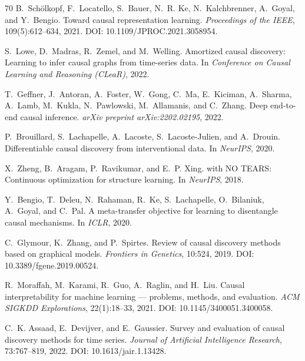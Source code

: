 \documentclass[11pt]{article}
\begin{document}
\begin{thebibliography}{70}
B.~Sch{\"o}lkopf, F.~Locatello, S.~Bauer, N.~R. Ke, N.~Kalchbrenner, A.~Goyal, and Y.~Bengio.
\newblock Toward causal representation learning.
\newblock \emph{Proceedings of the IEEE}, 109(5):612--634, 2021.
\newblock DOI: 10.1109/JPROC.2021.3058954.

S.~Lowe, D.~Madras, R.~Zemel, and M.~Welling.
\newblock Amortized causal discovery: Learning to infer causal graphs from time-series data.
\newblock In \emph{Conference on Causal Learning and Reasoning (CLeaR)}, 2022.

T.~Geffner, J.~Antoran, A.~Foster, W.~Gong, C.~Ma, E.~Kiciman, A.~Sharma, A.~Lamb, M.~Kukla, N.~Pawlowski, M.~Allamanis, and C.~Zhang.
\newblock Deep end-to-end causal inference.
\newblock \emph{arXiv preprint arXiv:2202.02195}, 2022.

P.~Brouillard, S.~Lachapelle, A.~Lacoste, S.~Lacoste-Julien, and A.~Drouin.
\newblock Differentiable causal discovery from interventional data.
\newblock In \emph{NeurIPS}, 2020.

X.~Zheng, B.~Aragam, P.~Ravikumar, and E.~P. Xing.
 with {NO TEARS}: Continuous optimization for structure learning.
\newblock In \emph{NeurIPS}, 2018.

Y.~Bengio, T.~Deleu, N.~Rahaman, R.~Ke, S.~Lachapelle, O.~Bilaniuk, A.~Goyal, and C.~Pal.
\newblock A meta-transfer objective for learning to disentangle causal mechanisms.
\newblock In \emph{ICLR}, 2020.

C.~Glymour, K.~Zhang, and P.~Spirtes.
\newblock Review of causal discovery methods based on graphical models.
\newblock \emph{Frontiers in Genetics}, 10:524, 2019.
\newblock DOI: 10.3389/fgene.2019.00524.

R.~Moraffah, M.~Karami, R.~Guo, A.~Raglin, and H.~Liu.
\newblock Causal interpretability for machine learning --- problems, methods, and evaluation.
\newblock \emph{ACM SIGKDD Explorations}, 22(1):18--33, 2021.
\newblock DOI: 10.1145/3400051.3400058.

C.~K. Assaad, E.~Devijver, and E.~Gaussier.
\newblock Survey and evaluation of causal discovery methods for time series.
\newblock \emph{Journal of Artificial Intelligence Research}, 73:767--819, 2022.
\newblock DOI: 10.1613/jair.1.13428.


\end{thebibliography}
\end{document}
